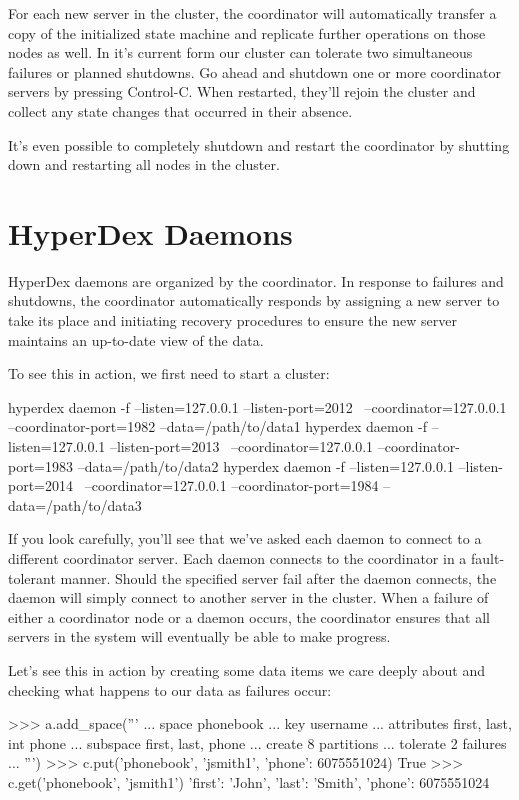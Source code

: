 For each new server in the cluster, the coordinator will automatically transfer
a copy of the initialized state machine and replicate further operations on
those nodes as well.  In it's current form our cluster can tolerate two
simultaneous failures or planned shutdowns.  Go ahead and shutdown one or more
coordinator servers by pressing Control-C.  When restarted, they'll rejoin the
cluster and collect any state changes that occurred in their absence.

It's even possible to completely shutdown and restart the coordinator by
shutting down and restarting all nodes in the cluster.

\section{HyperDex Daemons}

HyperDex daemons are organized by the coordinator.  In response to failures and
shutdowns, the coordinator automatically responds by assigning a new server to
take its place and initiating recovery procedures to ensure the new server
maintains an up-to-date view of the data.

To see this in action, we first need to start a cluster:

\begin{consolecode}
hyperdex daemon -f --listen=127.0.0.1 --listen-port=2012 \
                   --coordinator=127.0.0.1 --coordinator-port=1982 --data=/path/to/data1
hyperdex daemon -f --listen=127.0.0.1 --listen-port=2013 \
                   --coordinator=127.0.0.1 --coordinator-port=1983 --data=/path/to/data2
hyperdex daemon -f --listen=127.0.0.1 --listen-port=2014 \
                   --coordinator=127.0.0.1 --coordinator-port=1984 --data=/path/to/data3
\end{consolecode}

If you look carefully, you'll see that we've asked each daemon to connect to a
different coordinator server.  Each daemon connects to the coordinator in a
fault-tolerant manner.  Should the specified server fail after the daemon
connects, the daemon will simply connect to another server in the cluster.  When
a failure of either a coordinator node or a daemon occurs, the coordinator
ensures that all servers in the system will eventually be able to make progress.

Let's see this in action by creating some data items we care deeply about and
checking what happens to our data as failures occur:

\begin{pythoncode}
>>> a.add_space('''
... space phonebook
... key username
... attributes first, last, int phone
... subspace first, last, phone
... create 8 partitions
... tolerate 2 failures
... ''')
>>> c.put('phonebook', 'jsmith1', {'phone': 6075551024})
True
>>> c.get('phonebook', 'jsmith1')
{'first': 'John', 'last': 'Smith', 'phone': 6075551024}
\end{pythoncode}


